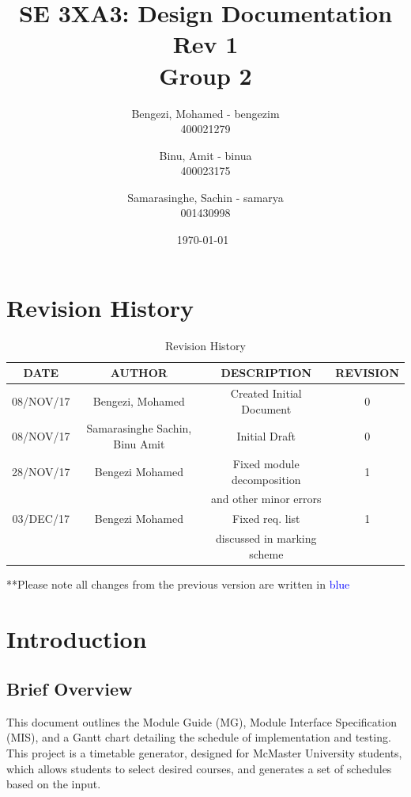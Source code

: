 \documentclass[11pt, oneside]{article}
\title{SE 3XA3: Design Documentation Rev 1 \\ \textbf{Group 2}
}
\author{Bengezi, Mohamed - bengezim\\
		400021279
		\and
		Binu, Amit - binua\\
		400023175
		\and
		Samarasinghe, Sachin - samarya \\
		001430998}
\date{\today\ }
\begin{document}
\maketitle
\newpage

\tableofcontents\par
\listoftables
\listoffigures
\newpage


\section{Revision History}

\begin{table}[hp]
\caption{Revision History}
\begin{center}
\label{tab:}
\begin{tabular}{|c|c|c|c|}
\hline
\textbf{DATE} & \textbf{AUTHOR} & \textbf{DESCRIPTION} & \textbf{REVISION}\\
\hline
08/NOV/17  & Bengezi, Mohamed & Created Initial Document & 0\\
\hline
08/NOV/17 & Samarasinghe Sachin, Binu Amit & Initial Draft & 0\\
\hline
28/NOV/17 &Bengezi Mohamed & Fixed module decomposition & 1\\
&& and other minor errors& \\
\hline
03/DEC/17 &Bengezi Mohamed & Fixed req. list& 1\\
&& discussed in marking scheme& \\
\hline

\end{tabular}
\end{center}
\label{default}
\end{table}

**Please note all changes from the previous version are written in \textcolor{blue}{blue}




\newpage
\section{Introduction}
\subsection{Brief Overview}
\tab This document outlines the Module Guide (MG), Module Interface Specification (MIS), and a Gantt chart detailing the schedule of implementation and testing. This project is a timetable generator, designed for McMaster University students, which allows students to select desired courses, and generates a set of schedules based on the input. 
\end{document}
